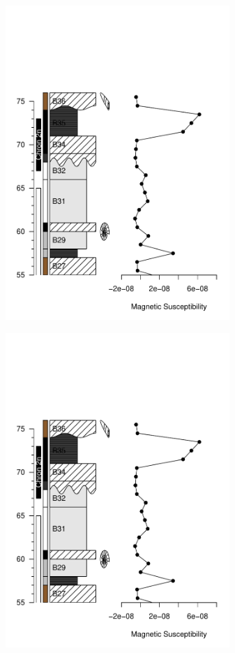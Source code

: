\begin{figure}[H]
	\centering
	\includegraphics[width=85mm, page=2]{divided2}
\end{figure}

\begin{figure}[H]
	\centering
	\includegraphics[width=85mm, page=3]{divided2}
\end{figure}

